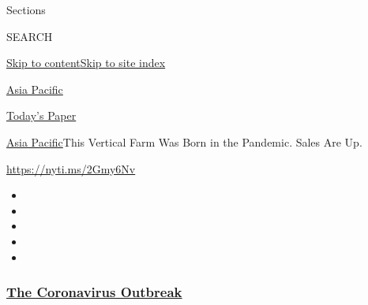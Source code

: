 Sections

SEARCH

\protect\hyperlink{site-content}{Skip to
content}\protect\hyperlink{site-index}{Skip to site index}

\href{https://www.nytimes3xbfgragh.onion/section/world/asia}{Asia
Pacific}

\href{https://myaccount.nytimes3xbfgragh.onion/auth/login?response_type=cookie\&client_id=vi}{}

\href{https://www.nytimes3xbfgragh.onion/section/todayspaper}{Today's
Paper}

\href{/section/world/asia}{Asia Pacific}\textbar{}This Vertical Farm Was
Born in the Pandemic. Sales Are Up.

\url{https://nyti.ms/2Gmy6Nv}

\begin{itemize}
\item
\item
\item
\item
\item
\end{itemize}

\hypertarget{the-coronavirus-outbreak}{%
\subsubsection{\texorpdfstring{\href{https://www.nytimes3xbfgragh.onion/news-event/coronavirus?name=styln-coronavirus-national\&region=TOP_BANNER\&block=storyline_menu_recirc\&action=click\&pgtype=Article\&impression_id=ac6e7e30-f52c-11ea-943d-89ef8ebe8e9e\&variant=undefined}{The
Coronavirus
Outbreak}}{The Coronavirus Outbreak}}\label{the-coronavirus-outbreak}}

